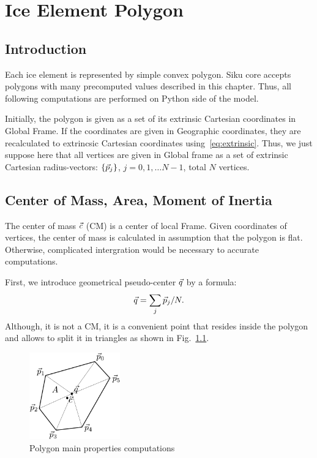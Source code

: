 
\chapter{Ice Element Polygon}

\section{Introduction}

Each ice element is represented by simple convex polygon. Siku core
accepts polygons with many precomputed values described in this
chapter. Thus, all following computations are performed on Python side
of the model.

Initially, the polygon is given as a set of its extrinsic Cartesian
coordinates in Global Frame. If the coordinates are given in
Geographic coordinates, they are recalculated to extrincsic Cartesian
coordinates using~\eqref{eq:extrinsic}. Thus, we just suppose here
that all vertices are given in Global frame as a set of extrinsic
Cartesian radius-vectors: $\{{{\vec{p}}}_j\}$, $j=0,1,\dots N-1$, total
$N$ vertices.

\section{Center of Mass, Area, Moment of Inertia}

The center of mass ${{\vec{c}}}$ (CM) is a center of local Frame. Given
coordinates of vertices, the center of mass is calculated in
assumption that the polygon is flat. Otherwise, complicated
intergration would be necessary to accurate computations.

First, we introduce geometrical pseudo-center ${{\vec{q}}}$ by a formula:
\begin{equation}
  {{\vec{q}}} = \sum_{j} {{\vec{p}}}_j / N.
\end{equation}
Although, it is not a CM, it is a convenient point that resides inside
the polygon and allows to split it in triangles as shown in
Fig.~\ref{fig:polygon}.
\begin{figure}
  \center
  \includegraphics[width=0.35\textwidth]{pics/polygon.pdf}
  \caption{Polygon main properties computations}
  \label{fig:polygon}
\end{figure}

